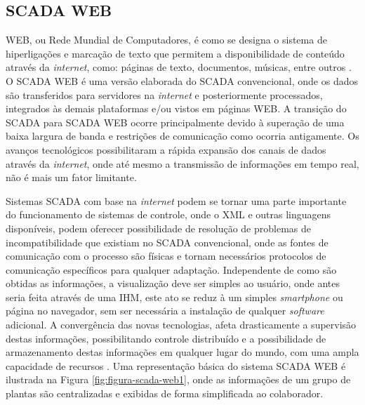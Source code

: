     \subsection{SCADA WEB}
    \label{sec:scadaweb}
    
    \gls{WEB}, ou Rede Mundial de Computadores, é como se designa o sistema de hiperligações e marcação de texto que permitem a disponibilidade de conteúdo através da \textit{internet}, como: páginas de texto, documentos, músicas, entre outros \cite{W3C}. O \gls{SCADA} \gls{WEB} é uma versão elaborada do SCADA convencional, onde os dados são transferidos para servidores na \textit{internet} e posteriormente processados, integrados às demais plataformas e/ou vistos em páginas WEB. A transição do SCADA para \gls{SCADA} \gls{WEB} ocorre principalmente devido à superação de uma baixa largura de banda e restrições de comunicação como ocorria antigamente. Os avanços tecnológicos possibilitaram a rápida expansão dos canais de dados através da \textit{internet}, onde até mesmo a transmissão de informações em tempo real, não é mais um fator limitante. \cite{ScadaWebSimp}
    
    Sistemas \gls{SCADA} com base na \textit{internet} podem se tornar uma parte importante do funcionamento de sistemas de controle, onde o \gls{XML} e outras linguagens disponíveis, podem oferecer possibilidade de resolução de problemas de incompatibilidade que existiam no \gls{SCADA} convencional, onde as fontes de comunicação com o processo são físicas e tornam necessários protocolos de comunicação específicos para qualquer adaptação. Independente de como são obtidas as informações, a visualização deve ser simples ao usuário, onde antes seria feita através de uma \gls{IHM}, este ato se reduz à um simples \textit{smartphone} ou página no navegador, sem ser necessária a instalação de qualquer \textit{software} adicional. A convergência das novas tecnologias, afeta drasticamente a supervisão destas informações, possibilitando controle distribuído e a possibilidade de armazenamento destas informações em qualquer lugar do mundo, com uma ampla capacidade de recursos \cite{ScadaWebInterOp}. Uma representação básica do sistema \gls{SCADA} \gls{WEB} é ilustrada na Figura \ref{fig:figura-scada-web1}, onde as informações de um grupo de plantas são centralizadas e exibidas de forma simplificada ao colaborador.
    
